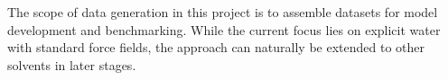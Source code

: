 
The scope of data generation in this project is to assemble datasets for model development and benchmarking. While the current focus lies on explicit water with standard force fields, the approach can naturally be extended to other solvents in later stages.

